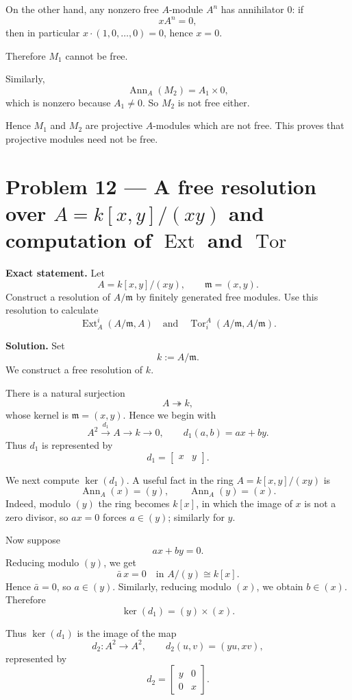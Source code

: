 \documentclass[12pt,a4paper]{article}
\theoremstyle{notespace}
\begin{document}
On the other hand, any nonzero free \(A\)-module \(A^n\) has annihilator \(0\): if
\[
xA^n=0,
\]
then in particular \(x\cdot (1,0,\dots,0)=0\), hence \(x=0\).

Therefore \(M_1\) cannot be free.

Similarly,
\[
\operatorname{Ann}_A(M_2)=A_1\times 0,
\]
which is nonzero because \(A_1\neq 0\). So \(M_2\) is not free either.

Hence \(M_1\) and \(M_2\) are projective \(A\)-modules which are not free. This proves that projective modules need not be free.	
	
	
\section{Problem 12 --- A free resolution over \texorpdfstring{$A=k[x,y]/(xy)$}{A = k[x,y]/(xy)} and computation of \texorpdfstring{$\operatorname{Ext}$}{Ext} and \texorpdfstring{$\operatorname{Tor}$}{Tor}}

\textbf{Exact statement.}
Let
\[
A=k[x,y]/(xy),\qquad \mathfrak m=(x,y).
\]
Construct a resolution of \(A/\mathfrak m\) by finitely generated free modules. Use this resolution to calculate
\[
\operatorname{Ext}_A^i(A/\mathfrak m,A)
\quad\text{and}\quad
\operatorname{Tor}_i^A(A/\mathfrak m,A/\mathfrak m).
\]

\textbf{Solution.}
Set
\[
k:=A/\mathfrak m.
\]
We construct a free resolution of \(k\).

There is a natural surjection
\[
A\twoheadrightarrow k,
\]
whose kernel is \(\mathfrak m=(x,y)\). Hence we begin with
\[
A^2 \xrightarrow{d_1} A \to k \to 0,
\qquad
d_1(a,b)=ax+by.
\]
Thus \(d_1\) is represented by
\[
d_1=\begin{bmatrix}x&y\end{bmatrix}.
\]

We next compute \(\ker(d_1)\). A useful fact in the ring \(A=k[x,y]/(xy)\) is
\[
\operatorname{Ann}_A(x)=(y),
\qquad
\operatorname{Ann}_A(y)=(x).
\]
Indeed, modulo \((y)\) the ring becomes \(k[x]\), in which the image of \(x\) is not a zero divisor, so \(ax=0\) forces \(a\in (y)\); similarly for \(y\).

Now suppose
\[
ax+by=0.
\]
Reducing modulo \((y)\), we get
\[
\bar a\,x=0 \quad\text{in } A/(y)\cong k[x].
\]
Hence \(\bar a=0\), so \(a\in (y)\). Similarly, reducing modulo \((x)\), we obtain \(b\in (x)\). Therefore
\[
\ker(d_1)=(y)\times (x).
\]

Thus \(\ker(d_1)\) is the image of the map
\[
d_2:A^2\to A^2,
\qquad
d_2(u,v)=(yu,xv),
\]
represented by
\[
d_2=
\begin{bmatrix}
	y&0\\
	0&x
\end{bmatrix}.
\]
\end{document}
